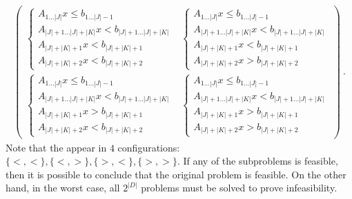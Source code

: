 \documentclass[runningheads]{llncs}
\begin{document}
\begin{gather*}
    \begin{pmatrix}
        \begin{cases}
            A_{1 \dots |J|} x \le b_{1 \dots |J| - 1}                 \\
            A_{|J| + 1\dots |J| + |K|} x < b_{|J| + 1\dots |J| + |K|} \\
            A_{|J| + |K| + 1} x < b_{|J| + |K| + 1}                   \\
            A_{|J| + |K| + 2} x < b_{|J| + |K| + 2}
        \end{cases}
         &
        \begin{cases}
            A_{1 \dots |J|} x \le b_{1 \dots |J| - 1}                 \\
            A_{|J| + 1\dots |J| + |K|} x < b_{|J| + 1\dots |J| + |K|} \\
            A_{|J| + |K| + 1} x < b_{|J| + |K| + 1}                   \\
            A_{|J| + |K| + 2} x > b_{|J| + |K| + 2}
        \end{cases}
        \\
        \begin{cases}
            A_{1 \dots |J|} x \le b_{1 \dots |J| - 1}                 \\
            A_{|J| + 1\dots |J| + |K|} x < b_{|J| + 1\dots |J| + |K|} \\
            A_{|J| + |K| + 1} x > b_{|J| + |K| + 1}                   \\
            A_{|J| + |K| + 2} x < b_{|J| + |K| + 2}
        \end{cases}
         &
        \begin{cases}
            A_{1 \dots |J|} x \le b_{1 \dots |J| - 1}                 \\
            A_{|J| + 1\dots |J| + |K|} x < b_{|J| + 1\dots |J| + |K|} \\
            A_{|J| + |K| + 1} x > b_{|J| + |K| + 1}                   \\
            A_{|J| + |K| + 2} x > b_{|J| + |K| + 2}
        \end{cases}
    \end{pmatrix}\ .
\end{gather*}
Note that the \nqcs appear in $4$ configurations: $\{<, <\}, \{<, >\}, \{>, <\}, \{>, >\}$.
If any of the subproblems is feasible, then it is possible to conclude that the original problem is feasible.
On the other hand, in the worst case, all $2^{|D|}$ problems must be solved to prove infeasibility.
\end{document}
